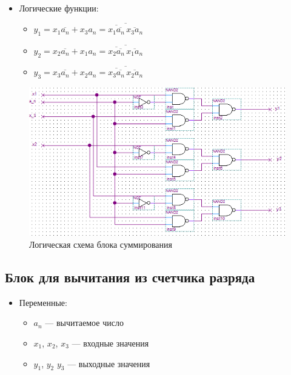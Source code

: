 \documentclass[utf8x, 12pt]{G7-32}
\begin{document}
\begin{itemize}
	\item Логические функции:
	\begin{itemize}
		\item $y_1 = x_1 \overline{a_n} + x_3 a_n = \overline{\overline{x_1 \overline{a_n}} \, \overline{x_3 a_n}}$
		\item $y_2 = x_2 \overline{a_n} + x_1 a_n = \overline{\overline{x_2 \overline{a_n}} \, \overline{x_1 a_n}}$
		\item $y_3 = x_3 \overline{a_n} + x_2 a_n = \overline{\overline{x_3 \overline{a_n}} \, \overline{x_2 a_n}}$
	\end{itemize}
\end{itemize}

\newpage

\begin{figure}[hhh!]
\begin{center}
\includegraphics[width=14cm]{img/SUM}
\end{center}
\vspace{-5mm}\caption{Логическая схема блока суммирования}
\end{figure}

\newpage

\subsection{Блок для вычитания из счетчика разряда}

\begin{itemize}
	\item Переменные:
		\begin{itemize}
			\item $a_n$ --- вычитаемое число
			\item $x_1$, $x_2$, $x_3$ --- входные значения
			\item $y_1$, $y_2$ $y_3$ --- выходные значения
		\end{itemize}

\end{itemize}
\end{document}
